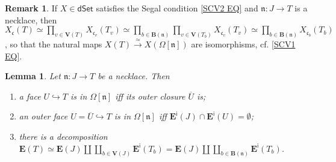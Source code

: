 \documentclass[a4paper,10pt
,draft
]{article}%
\numberwithin{equation}{section}
\numberwithin{figure}{section}
\newtheorem{lemma}[equation]{Lemma}%
\theoremstyle{definition} %
\newtheorem{remark}[equation]{Remark}%
\newcommand{\dSet}{\mathsf{dSet}}
\newcommand{\1}{\ensuremath{\mathbbm 1}}%
\begin{document}
\begin{remark}\label{SEGFORNECK REM}
	If $X\in \dSet$ satisfies the Segal condition \eqref{SCV2 EQ}
	and $\mathfrak{n}\colon J \to T$ is a necklace, then	
	$X_{\mathfrak{c}}(T)
	\simeq 
	\prod_{v \in \boldsymbol{V}(T)}
	X_{\mathfrak{c}_v}(T_v)
	\simeq
	\prod_{b \in \boldsymbol{B}(\mathfrak{n})}
	\prod_{v \in \boldsymbol{V}(T_b)}
	X_{\mathfrak{c}_v}(T_v)
	\simeq
	\prod_{b \in \boldsymbol{B}(\mathfrak{n})}
	X_{\mathfrak{c}_b}(T_b)$,
	so that the natural maps
	$X(T) \xrightarrow{\simeq} X(\Omega[\mathfrak{n}])$
	are isomorphisms, cf. \eqref{SCV1 EQ}.
\end{remark}





\begin{lemma}\label{FACEINNECK LEM}
	Let $\mathfrak{n} \colon J \to T$ be a necklace. Then
	\begin{enumerate}[label=(\roman*)]
		\item a face $U \hookrightarrow T$
		is in $\Omega[\mathfrak{n}]$
		iff its outer closure $\overline{U}$ is; 
		\item an outer face 
		$U = \overline{U} \hookrightarrow T$
		is in $\Omega[\mathfrak{n}]$ iff 
		$\boldsymbol{E}^{\mathsf{i}}(J) \cap 
		\boldsymbol{E}^{\mathsf{i}}(U) = \emptyset$;
		\item there is a decomposition
		$
		\boldsymbol{E}(T) \simeq
		\boldsymbol{E}(J) \amalg 
		\coprod_{b \in \boldsymbol{V}(J)}
		\boldsymbol{E}^{\mathsf{i}}(T_b)
		= 
		\boldsymbol{E}(J) \amalg 
		\coprod_{b \in \boldsymbol{B}(\mathfrak{n})}
		\boldsymbol{E}^{\mathsf{i}}(T_b)
		$.
	\end{enumerate}
\end{lemma}
\end{document}
